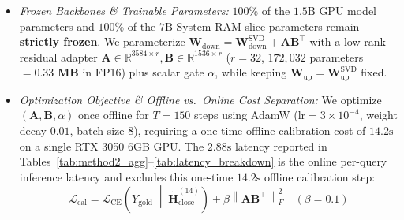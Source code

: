 \documentclass[10pt,twocolumn]{article}
\begin{document}
\begin{enumerate}
\begin{itemize}
        \item \emph{Frozen Backbones \& Trainable Parameters:} $100\%$ of the $1.5\text{B}$ GPU model parameters and $100\%$ of the $7\text{B}$ System-RAM slice parameters remain \textbf{strictly frozen}. We parameterize $\mathbf{W}_{\text{down}} = \mathbf{W}_{\text{down}}^{\text{SVD}} + \mathbf{A}\mathbf{B}^\top$ with a low-rank residual adapter $\mathbf{A} \in \mathbb{R}^{3584 \times r}, \mathbf{B} \in \mathbb{R}^{1536 \times r}$ ($r = 32$, $172,032$ parameters $= \mathbf{0.33\text{ MB}}$ in FP16) plus scalar gate $\alpha$, while keeping $\mathbf{W}_{\text{up}} = \mathbf{W}_{\text{up}}^{\text{SVD}}$ fixed.
        \item \emph{Optimization Objective \& Offline vs.\ Online Cost Separation:} We optimize $(\mathbf{A}, \mathbf{B}, \alpha)$ once offline for $T = 150$ steps using AdamW ($\text{lr} = 3\times 10^{-4}$, weight decay $0.01$, batch size $8$), requiring a one-time offline calibration cost of $14.2\text{s}$ on a single RTX 3050 6GB GPU. The $2.88\text{s}$ latency reported in Tables~\ref{tab:method2_agg}--\ref{tab:latency_breakdown} is the online per-query inference latency and excludes this one-time $14.2\text{s}$ offline calibration step:
        \begin{equation}
            \mathcal{L}_{\text{cal}} = \mathcal{L}_{\text{CE}}\left(Y_{\text{gold}} \;\middle|\; \tilde{\mathbf{H}}_{\text{close}}^{(14)}\right) + \beta \left\|\mathbf{A}\mathbf{B}^\top\right\|_F^2 \quad (\beta = 0.1)
        \end{equation}
    \end{itemize}
\end{enumerate}
\end{document}
